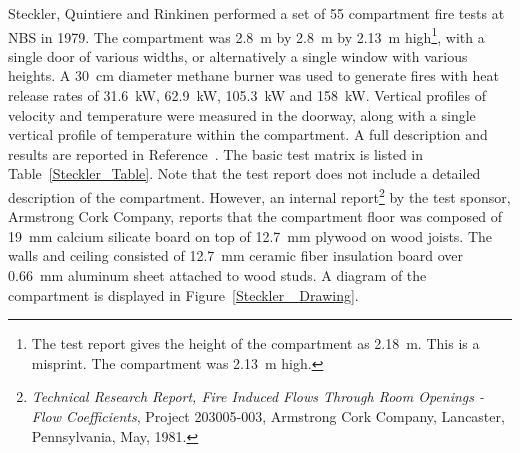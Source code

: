 Steckler, Quintiere and Rinkinen performed a set of 55 compartment fire tests at NBS in 1979. The compartment was 2.8~m by 2.8~m by 2.13~m high\footnote{The test report
gives the height of the compartment as 2.18~m. This is a misprint. The compartment was 2.13~m high.}, with a single door of
various widths, or alternatively a single window with various heights. A 30~cm diameter methane burner was used to generate fires with heat release rates of
31.6~kW, 62.9~kW, 105.3~kW and 158~kW. Vertical profiles of velocity and temperature were measured in the doorway, along with a single vertical profile of temperature
within the compartment.
A full description and results are reported in Reference~\cite{Steckler:NBSIR_82-2520}. The basic test matrix is listed in Table~\ref{Steckler_Table}. Note that the
test report does not include a detailed description of the compartment. However, an internal report\footnote{ {\em Technical Research Report, Fire Induced Flows
Through Room Openings - Flow Coefficients}, Project 203005-003, Armstrong Cork Company, Lancaster, Pennsylvania, May, 1981.} by the test sponsor, Armstrong Cork Company,
reports that the compartment floor was composed of 19~mm calcium silicate board on top of 12.7~mm plywood on wood joists. The walls and ceiling consisted of
12.7~mm ceramic fiber insulation board over 0.66~mm aluminum sheet attached to wood studs. A diagram of the compartment is displayed in Figure~\ref{Steckler_ Drawing}.


